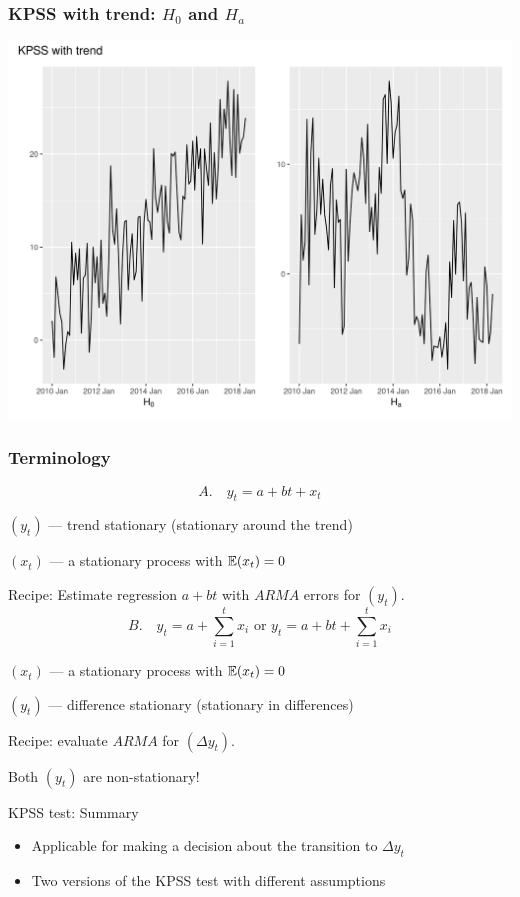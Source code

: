 \begin{frame}
	\frametitle{KPSS with trend: $H_0$ and $H_a$}
	\includegraphics[width=\textwidth]{pictures/om_ts_06-086.png}
\end{frame}

\begin{frame}
	\frametitle{Terminology}
	\[
	A. \quad y_t = a + bt + x_t
	\]
	
	$(y_t)$ — \alert{trend stationary} (stationary around the trend)
	
	$(x_t)$ — a stationary process with $\mathbb{E}(x_t) = 0$
	
	\pause Recipe: Estimate regression $a + bt$ with $ARMA$ errors for $(y_t)$.
	\pause
	\[
	B. \quad y_t = a + \sum_{i=1}^t x_i \text{ or } y_t = a + bt + \sum_{i=1}^t x_i
	\]
	
	$(x_t)$ — a stationary process with $\mathbb{E}(x_t) = 0$
	
	$(y_t)$ — \alert{difference stationary} (stationary in differences)
	
	\pause Recipe: evaluate $ARMA$ for $(\Delta y_t)$.
	
	\pause Both $(y_t)$ are non-stationary!
	
\end{frame}



\begin{frame}{KPSS test: Summary}
	
	\begin{itemize}[<+->]
		\item Applicable for making a decision about the transition to $\Delta y_t$
		\item Two versions of the KPSS test with different assumptions	
		
	\end{itemize}
\end{frame}



